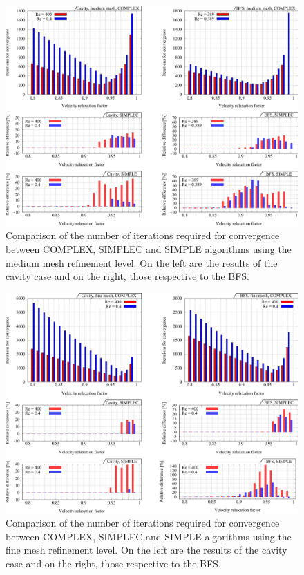\documentclass[final,3p,times,11pt,onecolumn]{myElsarticle}
\numberwithin{equation}{section}
\begin{document}
\begin{figure}[t!]
\centering
\includegraphics[width=17cm]{fig/Results/complexMedium.pdf}
\caption{Comparison of the number of iterations required for convergence between COMPLEX, SIMPLEC and SIMPLE algorithms using the medium mesh refinement level. On the left are the results of the cavity case and on the right, those respective to the BFS.}
\label{Fig:complexMedium}
\end{figure}

\begin{figure}[t!]
\centering
\includegraphics[width=17cm]{fig/Results/complexFine.pdf}
\caption{Comparison of the number of iterations required for convergence between COMPLEX, SIMPLEC and SIMPLE algorithms using the fine mesh refinement level. On the left are the results of the cavity case and on the right, those respective to the BFS.}
\label{Fig:complexFine}
\end{figure}
\end{document}
